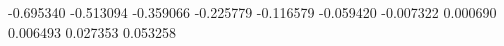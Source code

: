 -0.695340
-0.513094
-0.359066
-0.225779
-0.116579
-0.059420
-0.007322
0.000690
0.006493
0.027353
0.053258
